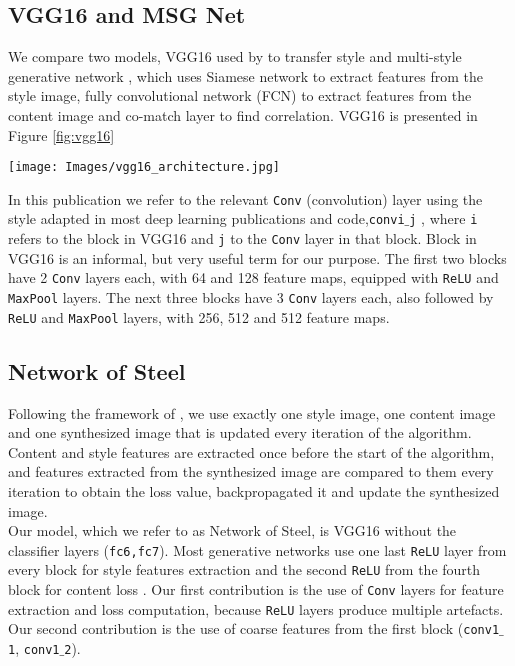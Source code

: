 \documentclass[a4paper,twoside]{article}
\begin{document}
\subsection{VGG16 and MSG Net} 
\noindent We compare two models, VGG16 \cite{simonyan2014very} used by \cite{gatys2016image} to transfer style and multi-style generative network \cite{zhang2017multi}, which uses Siamese network to extract features from the style image, fully convolutional network (FCN) to extract features from the content image and co-match layer to find correlation. VGG16 is presented in Figure \ref{fig:vgg16}
\begin{figure*}
  \centering
   \texttt{[image: Images/vgg16\_architecture.jpg]}
  \caption{VGG16 architecture. There are in total five blocks, the first two blocks have two \texttt{Conv} layers, each followed by \texttt{ReLU} and \texttt{MaxPool} layers, the last three have three \texttt{Conv} layers, each followed by \texttt{ReLU} and \texttt{MaxPool} layers. Image taken from \cite{das2018document}.}
  \label{fig:vgg16}
 \end{figure*}
In this publication we refer to the relevant \texttt{Conv} (convolution) layer using the style adapted in most deep learning publications and code,\texttt{convi${}\_{}$j} , where \texttt{i} refers to the block in VGG16 and \texttt{j} to the \texttt{Conv} layer in that block. Block in VGG16 is an informal, but very useful term for our purpose. The first two blocks have 2 \texttt{Conv} layers each, with 64 and 128 feature maps, equipped with \texttt{ReLU} and \texttt{MaxPool} layers. The next three blocks have 3 \texttt{Conv} layers each, also followed by \texttt{ReLU} and \texttt{MaxPool} layers, with 256, 512 and 512 feature maps.
\subsection{Network of Steel}
Following the framework of \cite{gatys2016image}, we use exactly one style image, one content image and one synthesized image that is updated every iteration of the algorithm. Content and style features  are extracted once before the start of the algorithm, and features extracted from the synthesized image are compared to them every iteration to obtain the loss value, backpropagated it and update the synthesized image.\\

\noindent Our model, which we refer to as Network of Steel, is VGG16 without the classifier layers (\texttt{fc6,fc7}). Most generative networks use one last \texttt{ReLU} layer from every block for style features extraction and the second \texttt{ReLU} from the fourth block for content loss \cite{gatys2016image}. Our first contribution is the use of \texttt{Conv} layers for feature extraction and loss computation, because \texttt{ReLU} layers produce multiple artefacts. Our second contribution is the use of coarse features from the first block (\texttt{conv1${}\_{}$1}, \texttt{conv1${}\_{}$2}).\\
\end{document}
